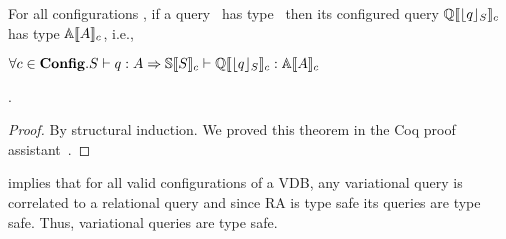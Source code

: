 \begin{theorem}
\label{thm:var-pres}
For all configurations \config, if a query \vQ\ has type \vType\ 
then its configured query \ensuremath{\eeSem {\constrain \vQ}}
has type \ensuremath{\olSem {\vType}}, i.e., \\
\centerline{
\ensuremath{
\forall \config \in \confSet. \envWithoutVctx { \vQ} {\vType} \Rightarrow 
\pEnv [\osSem {\vSch}] {\eeSem {\constrain \vQ}} {\olSem {\vType}}
}}.
\end{theorem}

\begin{proof}
By structural induction. We proved this theorem in the Coq proof assistant~\cite{Khan21}.
\end{proof}

 implies that for all valid configurations of a VDB, any variational
query is correlated to a relational query and since RA is type safe its queries are
type safe. Thus, variational queries are type safe. 

